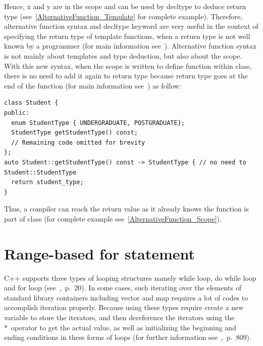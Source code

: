 \documentclass[11pt]{report}
\begin{document}
Hence, x and y are in the scope and can be used by decltype to deduce return type (see~\ref{AlternativeFunction_Template} for complete example). Therefore, alternative function syntax and decltype keyword are very useful in the context of specifying the return type of template functions, when a return type is not well known by a programmer (for main information see~\cite{Stroustrup:2012:Cpp11}). Alternative function syntax is not mainly about templates and type deduction, but also about the scope. With this new syntax, when the scope is written to define function within class, there is no need to add it again to return type because return type goes at the end of the function (for main information see~\cite{Allain:2011:FutureCpp}) as follow:
\begin{lstlisting}
class Student {
public:
  enum StudentType { UNDERGRADUATE, POSTGRADUATE};
  StudentType getStudentType() const;
  // Remaining code omitted for brevity
};
auto Student::getStudentType() const -> StudentType { // no need to Student::StudentType
  return student_type;
}
\end{lstlisting}
Thus, a compiler can reach the return value as it already knows the function is part of class (for complete example see~\ref{AlternativeFunction_Scope}).

\section{Range-based for statement}
\label{section: Range-based for statement}
C++ supports three types of looping structures namely while loop, do while loop and for loop (see~\cite{Gregorie:professionalcpp},~p.~20). In some cases, such iterating over the elements of standard library containers including vector and map requires a lot of codes to accomplish iteration properly. Because using these types require create a new variable to store the iterators, and then dereference the iterators using the *~operator to get the actual value, as well as initializing the beginning and ending conditions in these forms of loops (for further information see~\cite{Horstmann:2008:BC},~p.~809).
\end{document}
